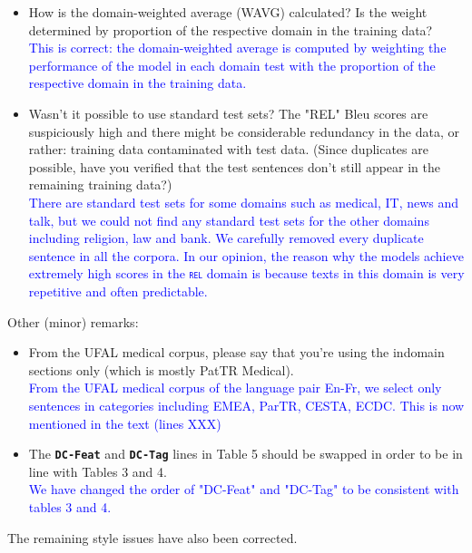 \documentclass[12pt,times,a4paper,twoside]{article}
\newcommand{\fyTodo}[1]{\Todo[FY:]{\textcolor{orange}{#1}}}
\theoremstyle{definition}
\newcommand{\domain}[1]{\texttt{\textsc{#1}}}
\newcommand{\system}[1]{\texttt{\textbf{#1}}}
\begin{document}
\begin{itemize}
\\
\item How is the domain-weighted average (WAVG) calculated? Is the weight determined by proportion of the respective domain in the training data?
\\
\textcolor{blue}{This is correct: the domain-weighted average is computed by weighting the performance of the model in each domain test with the proportion of the respective domain in the training data.}
\\
\item Wasn't it possible to use standard test sets? The "REL" Bleu scores are suspiciously high and there might be considerable redundancy in the data, or rather: training data contaminated with test data. (Since duplicates are possible, have you verified that the test sentences don't still appear in the remaining training data?)
\\
\textcolor{blue}{There are standard test sets for some domains such as medical, IT, news and talk, but we could not find any standard test sets for the other domains including religion, law and bank. We carefully removed every duplicate sentence in all the corpora. In our opinion, the reason why the models achieve extremely high scores in the \domain{rel} domain is because texts in this domain is very repetitive and often predictable.}\fyTodo{sentence length ?, diversity index of vocab ?}
\end{itemize}

Other (minor) remarks:

\begin{itemize}
\item From the UFAL medical corpus, please say that you're using the indomain sections only (which is mostly PatTR Medical).
\\
\textcolor{blue}{From the UFAL medical corpus of the language pair En-Fr, we select only sentences in categories including EMEA, ParTR, CESTA, ECDC. This is now mentioned in the text (lines XXX)}\fyTodo{Add lines num}
\\
\item The \system{DC-Feat} and \system{DC-Tag} lines in Table 5 should be swapped in order to be in line with Tables 3 and 4.
  \\
  \textcolor{blue}{We have changed the order of "DC-Feat" and "DC-Tag" to be consistent with tables 3 and 4.}
\end{itemize}

The remaining style issues have also been corrected.



\end{document}
